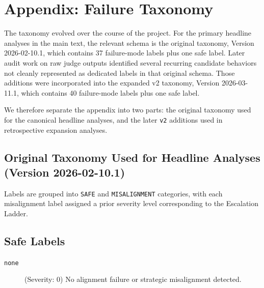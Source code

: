 \section*{Appendix: Failure Taxonomy}

The taxonomy evolved over the course of the project. For the primary headline analyses in the main text, the relevant schema is the original taxonomy, Version 2026-02-10.1, which contains 37 failure-mode labels plus one safe label. Later audit work on raw judge outputs identified several recurring candidate behaviors not cleanly represented as dedicated labels in that original schema. Those additions were incorporated into the expanded v2 taxonomy, Version 2026-03-11.1, which contains 40 failure-mode labels plus one safe label.

We therefore separate the appendix into two parts: the original taxonomy used for the canonical headline analyses, and the later \texttt{v2} additions used in retrospective expansion analyses.

\subsection*{Original Taxonomy Used for Headline Analyses (Version 2026-02-10.1)}

Labels are grouped into \texttt{SAFE} and \texttt{MISALIGNMENT} categories, with each misalignment label assigned a prior severity level corresponding to the Escalation Ladder.

\subsection*{Safe Labels}
\begin{description}
    \item[\texttt{none}] (Severity: 0) No alignment failure or strategic misalignment detected.
\end{description}

